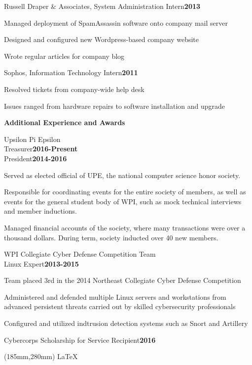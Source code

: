\documentclass[11pt,oneside]{letter}
\newenvironment{tightitemize}{\itemize\addtolength{\itemsep}{-0.2em}}{\enditemize}
\begin{document}
Russell Draper \& Associates, System Administration Intern\hfill{\bf2013}\\
\vspace{-0.28in}
{\footnotesize 
\begin{tightitemize}
  \item Managed deployment of SpamAssassin software onto company mail server
  \item Designed and configured new Wordpress-based company website
  \item Wrote regular articles for company blog
\end{tightitemize}}


Sophos, Information Technology Intern\hfill{\bf2011}\\
\vspace{-0.28in}
{\footnotesize 
\begin{tightitemize}
  \item Resolved tickets from company-wide help desk
  \item Issues ranged from hardware repairs to software installation and upgrade
\end{tightitemize}}


\bigskip

{\bf{\Large Additional Experience and Awards}}

Upsilon Pi Epsilon\\
Treasurer\hfill{\bf 2016-Present}\\
President\hfill{\bf 2014-2016}\\
\vspace{-0.28in}
{\footnotesize 
\begin{tightitemize}
  \item Served as elected official of UPE, the national computer science honor society. 
  \item Responsible for coordinating events for the entire society of members, as well as events for the general student body of WPI, such as mock technical interviews and member inductions. 
  \item Managed financial accounts of the society, where many transactions were over a thousand dollars. During term, society inducted over 40 new members.
\end{tightitemize}}

WPI Collegiate Cyber Defense Competition Team\\
Linux Expert\hfill{\bf2013-2015}\\
\vspace{-0.28in}
{\footnotesize 
\begin{tightitemize}
  \item Team placed 3rd in the 2014 Northeast Collegiate Cyber Defense Competition
  \item Administered and defended multiple Linux servers and workstations from advanced persistent threats carried out by skilled cybersecurity professionals
  \item Configured and utilized indtrusion detection systems such as Snort and Artillery
\end{tightitemize}}

Cybercorps Scholarship for Service Recipient\hfill{\bf 2016}\\

\begin{textblock*}{30mm}(185mm,280mm)
{\Large \LaTeX}
\end{textblock*}
\end{document}

